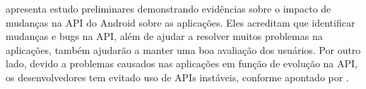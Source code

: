  apresenta estudo preliminares demonstrando evidências sobre o
impacto de mudanças na API do Android sobre as aplicações. Eles acreditam que
identificar mudanças e bugs na API, além de ajudar a resolver muitos problemas na
aplicações, também ajudarão a manter uma boa avaliação dos usuários. Por outro lado,
devido a problemas causados nas aplicações em função de evolução na API, os
desenvolvedores tem evitado uso de APIs instáveis, conforme apontado por .

